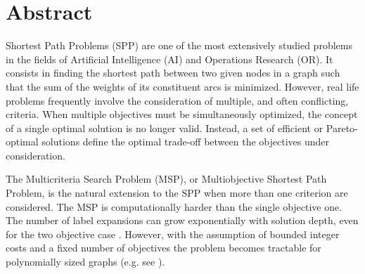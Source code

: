%
%
%
%
%
%

\chapter*{Abstract}

Shortest Path Problems (SPP) are one of the most extensively studied problems in the fields of Artificial Intelligence (AI) and Operations Research (OR). It consists in finding the shortest path between two given nodes in a graph such that the sum of the weights of its constituent arcs is minimized. However, real life problems frequently involve the consideration of multiple, and often conflicting, criteria. When multiple objectives must be simultaneously optimized, the concept of a single optimal solution is no longer valid. Instead, a set of efficient or Pareto-optimal solutions define the optimal trade-off between the objectives under consideration.  

The Multicriteria Search Problem (MSP), or Multiobjective Shortest Path Problem, is the natural extension to the SPP when more than one criterion are considered. The MSP is computationally harder than the single objective one. The number of label expansions can grow exponentially with solution depth, even for the two objective case \citep{hansen1979}. However, with the assumption of bounded integer costs and a fixed number of objectives the problem becomes tractable for polynomially sized graphs (e.g. see \citep{Mandow2009,Muller-Hannemann2006}).

